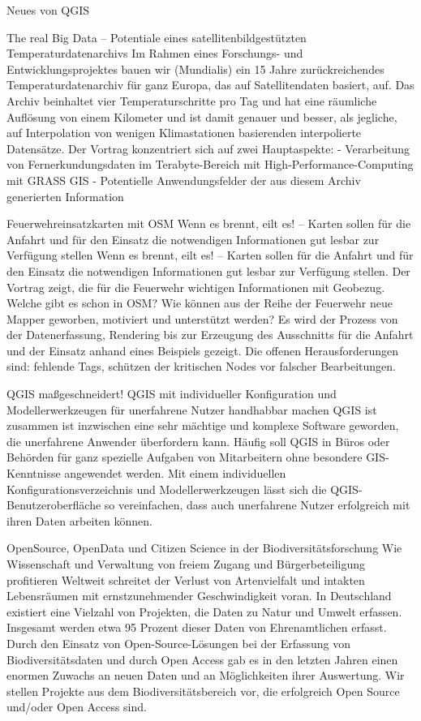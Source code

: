 %
{Neues von QGIS}%
{}%
{}

%
{The real Big Data – Potentiale eines satellitenbildgestützten Temperaturdatenarchivs}%
{}%
{Im Rahmen eines Forschungs- und Entwicklungsprojektes bauen wir (Mundialis) ein 15 Jahre
  zurückreichendes Temperaturdatenarchiv für ganz Europa, das auf Satellitendaten basiert, auf.
  Das Archiv beinhaltet vier Temperaturschritte pro Tag und hat eine räumliche Auflösung von einem
  Kilometer und ist damit genauer und besser, als jegliche, auf Interpolation von wenigen
  Klimastationen basierenden interpolierte Datensätze.
  Der Vortrag konzentriert sich auf zwei Hauptaspekte:
  - Verarbeitung von Fernerkundungsdaten im Terabyte-Bereich mit High-Performance-Computing mit
  GRASS GIS
- Potentielle Anwendungsfelder der aus diesem Archiv generierten Information}

%
{Feuerwehreinsatzkarten mit OSM}%
{Wenn es brennt, eilt es! – Karten sollen für die Anfahrt und für den Einsatz die notwendigen
Informationen gut lesbar zur Verfügung stellen}%
{Wenn es brennt, eilt es! -- Karten sollen für die
  Anfahrt und für den Einsatz die notwendigen Informationen gut lesbar zur Verfügung stellen.
Der Vortrag zeigt, die für die Feuerwehr wichtigen Informationen mit Geobezug. Welche gibt es schon
in OSM? Wie können aus der Reihe der Feuerwehr neue Mapper geworben, motiviert und unterstützt
werden?  Es wird der Prozess von der Datenerfassung, Rendering bis zur Erzeugung des Ausschnitts für
die
Anfahrt und der Einsatz anhand eines Beispiels gezeigt. Die offenen Herausforderungen sind: fehlende
Tags, schützen der kritischen Nodes vor falscher Bearbeitungen.}

%
{QGIS maßgeschneidert!}%
{QGIS mit individueller Konfiguration und Modellerwerkzeugen für unerfahrene Nutzer handhabbar machen}%
{QGIS ist zusammen ist inzwischen eine sehr mächtige und komplexe Software geworden, die unerfahrene
  Anwender überfordern kann.  Häufig soll QGIS in Büros oder Behörden für ganz spezielle Aufgaben
  von Mitarbeitern ohne besondere
GIS-Kenntnisse angewendet werden.  Mit einem individuellen Konfigurationsverzeichnis und
Modellerwerkzeugen lässt sich die QGIS-Benutzeroberfläche so vereinfachen, dass auch unerfahrene
Nutzer erfolgreich mit ihren Daten arbeiten können. 
}

%
{OpenSource, OpenData und Citizen Science in der Biodiversitätsforschung}%
{Wie Wissenschaft und Verwaltung von freiem Zugang und Bürgerbeteiligung profitieren}%
{Weltweit schreitet der Verlust von Artenvielfalt und intakten Lebensräumen mit ernstzunehmender
Geschwindigkeit voran. In Deutschland existiert eine Vielzahl von Projekten, die Daten zu Natur und
Umwelt erfassen. Insgesamt werden etwa 95 Prozent dieser Daten von Ehrenamtlichen erfasst.  Durch
den Einsatz von Open-Source-Lösungen bei der Erfassung von Biodiversitätsdaten und durch Open Access
gab es in den letzten Jahren einen enormen Zuwachs an neuen Daten und an Möglichkeiten ihrer
Auswertung. Wir stellen Projekte aus dem Biodiversitätsbereich vor, die erfolgreich Open Source
und/oder Open Access sind.}

